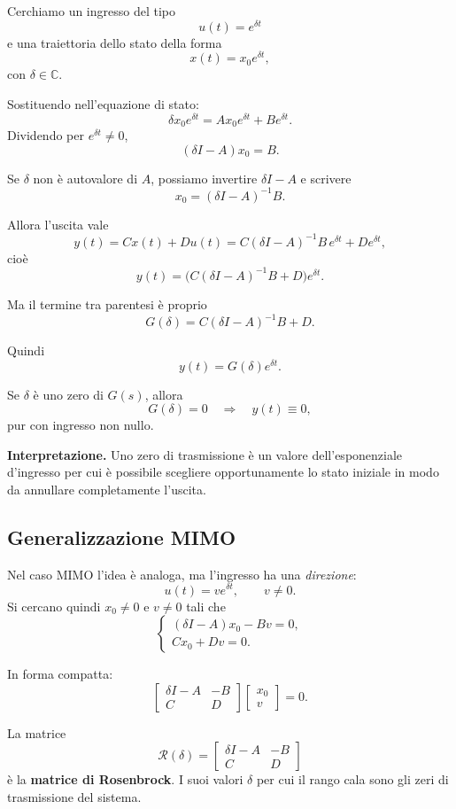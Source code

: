 Cerchiamo un ingresso del tipo
\[
u(t)=e^{\delta t}
\]
e una traiettoria dello stato della forma
\[
x(t)=x_0 e^{\delta t},
\]
con \(\delta\in\mathbb{C}\).

Sostituendo nell'equazione di stato:
\[
\delta x_0 e^{\delta t}=Ax_0 e^{\delta t}+B e^{\delta t}.
\]
Dividendo per \(e^{\delta t}\neq 0\),
\[
(\delta I-A)x_0=B.
\]

Se \(\delta\) non è autovalore di \(A\), possiamo invertire \(\delta I-A\) e scrivere
\[
x_0=(\delta I-A)^{-1}B.
\]

Allora l'uscita vale
\[
y(t)=C x(t)+D u(t)
= C(\delta I-A)^{-1}B\,e^{\delta t}+D e^{\delta t},
\]
cioè
\[
y(t)=\bigl(C(\delta I-A)^{-1}B+D\bigr)e^{\delta t}.
\]

Ma il termine tra parentesi è proprio
\[
G(\delta)=C(\delta I-A)^{-1}B+D.
\]

Quindi
\[
y(t)=G(\delta)e^{\delta t}.
\]

\medskip

\noindent
Se \(\delta\) è uno zero di \(G(s)\), allora
\[
G(\delta)=0
\quad\Longrightarrow\quad
y(t)\equiv 0,
\]
pur con ingresso non nullo.

\medskip

\noindent
\textbf{Interpretazione.}
Uno zero di trasmissione è un valore dell'esponenziale d'ingresso per cui è possibile scegliere opportunamente lo stato iniziale in modo da annullare completamente l'uscita.

\subsection{Generalizzazione MIMO}

Nel caso MIMO l'idea è analoga, ma l'ingresso ha una \emph{direzione}:
\[
u(t)=v e^{\delta t},\qquad v\neq 0.
\]
Si cercano quindi \(x_0\neq 0\) e \(v\neq 0\) tali che
\[
\begin{cases}
(\delta I-A)x_0-Bv=0,\\
Cx_0+Dv=0.
\end{cases}
\]

In forma compatta:
\[
\begin{bmatrix}
\delta I-A & -B\\
C & D
\end{bmatrix}
\begin{bmatrix}
x_0\\
v
\end{bmatrix}
=0.
\]

La matrice
\[
\mathcal{R}(\delta)=
\begin{bmatrix}
\delta I-A & -B\\
C & D
\end{bmatrix}
\]
è la \textbf{matrice di Rosenbrock}. I suoi valori \(\delta\) per cui il rango cala sono gli zeri di trasmissione del sistema.


